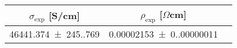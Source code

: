 \begin{tabular}{ccc}
\toprule
$\sigma_{\exp}$ [S/cm] & $\rho_{\exp}$ [$\Omega$cm] \\
\midrule
\num{46441.374(245.769)} & \num{0.00002153(0.00000011)} \\
\bottomrule
\end{tabular}
